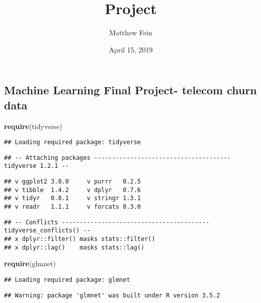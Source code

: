 \documentclass[]{article}
\title{Project}
\author{Matthew Fein}
\date{April 15, 2019}
\newenvironment{Shaded}{\begin{snugshade}}{\end{snugshade}}
\newcommand{\KeywordTok}[1]{\textcolor[rgb]{0.13,0.29,0.53}{\textbf{#1}}}
\newcommand{\NormalTok}[1]{#1}
\begin{document}
\maketitle

\subsection{Machine Learning Final Project- telecom churn
data}\label{machine-learning-final-project--telecom-churn-data}

\begin{Shaded}
\begin{Highlighting}[]
\KeywordTok{require}\NormalTok{(tidyverse)}
\end{Highlighting}
\end{Shaded}

\begin{verbatim}
## Loading required package: tidyverse
\end{verbatim}

\begin{verbatim}
## -- Attaching packages -------------------------------------- tidyverse 1.2.1 --
\end{verbatim}

\begin{verbatim}
## v ggplot2 3.0.0     v purrr   0.2.5
## v tibble  1.4.2     v dplyr   0.7.6
## v tidyr   0.8.1     v stringr 1.3.1
## v readr   1.1.1     v forcats 0.3.0
\end{verbatim}

\begin{verbatim}
## -- Conflicts ----------------------------------------- tidyverse_conflicts() --
## x dplyr::filter() masks stats::filter()
## x dplyr::lag()    masks stats::lag()
\end{verbatim}

\begin{Shaded}
\begin{Highlighting}[]
\KeywordTok{require}\NormalTok{(glmnet)}
\end{Highlighting}
\end{Shaded}

\begin{verbatim}
## Loading required package: glmnet
\end{verbatim}

\begin{verbatim}
## Warning: package 'glmnet' was built under R version 3.5.2
\end{verbatim}
\end{document}
